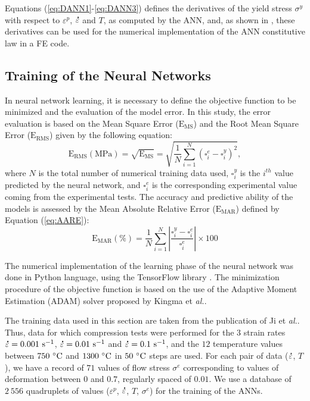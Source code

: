 \documentclass[algorithms,article,submit,pdftex,moreauthors]{Definitions/mdpi}
\makeatletter
\DeclareRobustCommand{\mdot}[1]{\accentset{\mbox{\bfseries .}}{#1}}
\DeclareRobustCommand{\eal}{et \emph{al.}\@\xspace}
\DeclareRobustCommand{\MSE}{\text{E}_\text{MS}}
\DeclareRobustCommand{\RMSE}{\text{E}_\text{RMS}}
\DeclareRobustCommand{\MARE}{\text{E}_\text{MAR}}
\DeclareRobustCommand{\ps}{\text{s}^{-1}}
\DeclareRobustCommand{\MPa}{\text{MPa}}
\makeatother
\begin{document}
Equations (\ref{eq:DANN1}-\ref{eq:DANN3}) defines the derivatives of the yield stress $\sigma^y$ with respect to $\varepsilon^p$, $\mdot\varepsilon$ and $T$, as computed by the ANN, and, as shown in \cite{Pantale-2021}, these derivatives can be used for the numerical implementation of the ANN constitutive law in a FE code.

\subsection{Training of the Neural Networks}\label{sec:ANN-traning}

In neural network learning, it is necessary to define the objective function to be minimized and the evaluation of the model error.
In this study, the error evaluation is based on the Mean Square Error ($\MSE$) and the Root Mean Square Error ($\RMSE$) given by the following equation:
\begin{equation}
\RMSE (\MPa) = \sqrt{\MSE} = \sqrt{\frac{1}{N} \sum_{i=1}^{N} \left(\square_i^e - \square_i^y\right)^2}, \label{eq:RMSE}
\end{equation}
where $N$ is the total number of numerical training data used, $\square_i^y$ is the $i^{th}$ value predicted by the neural network, and $\square_i^e$ is the corresponding experimental value coming from the experimental tests.
The accuracy and predictive ability of the models is assessed by the Mean Absolute Relative Error ($\MARE$) defined by Equation (\ref{eq:AARE}):
\begin{equation}
\MARE(\%) = \frac{1}{N} \sum_{i=1}^{N}{\left|\frac{\square_i^y -\square_i^e}{\square_i^e}\right|} \times 100 \label{eq:AARE}
\end{equation}

The numerical implementation of the learning phase of the neural network was done in Python language, using the TensorFlow library \cite{Abadi-2016, Mattmann-2020}.
The minimization procedure of the objective function is based on the use of the Adaptive Moment Estimation (ADAM) solver proposed by Kingma \eal \cite{Kingma-2015}.

The training data used in this section are taken from the publication of Ji \eal \cite{Ji-2018}.
Thus, data for which compression tests were performed for the $3$ strain rates $\mdot\varepsilon=0.001~\ps$, $\mdot\varepsilon=0.01~\ps$ and $\mdot\varepsilon=0.1~\ps$, and the $12$ temperature values between $750~\celsius$ and $1300~\celsius$ in $50~\celsius$ steps are used.
For each pair of data ($\mdot\varepsilon$, $T$), we have a record of $71$ values of flow stress $\sigma^e$ corresponding to values of deformation between $0$ and $0.7$, regularly spaced of $0.01$.
We use a database of $2~556$ quadruplets of values ($\varepsilon^p$, $\mdot\varepsilon$, $T$, $\sigma^e$) for the training of the ANNs.
\end{document}
